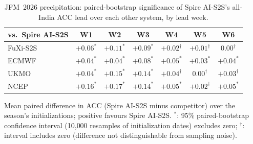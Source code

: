 \begin{table}[t]
  \centering
  \caption{JFM~2026 precipitation: paired-bootstrap significance of Spire AI-S2S's all-India ACC lead over each other system, by lead week.}
  \label{tab:jfm_sig_tp}
  \small
  \begin{tabular}{lcccccc}
    \toprule
    vs.\ Spire AI-S2S & W1 & W2 & W3 & W4 & W5 & W6 \\
    \midrule
    FuXi-S2S       & $+0.06^{*}$ & $+0.11^{*}$ & $+0.09^{*}$ & $+0.02^{\dagger}$ & $+0.01^{\dagger}$ & $0.00^{\dagger}$ \\
ECMWF          & $+0.04^{*}$ & $+0.04^{*}$ & $+0.08^{*}$ & $+0.05^{*}$ & $+0.03^{*}$ & $+0.04^{*}$ \\
UKMO           & $+0.04^{*}$ & $+0.15^{*}$ & $+0.14^{*}$ & $+0.04^{\dagger}$ & $0.00^{\dagger}$ & $+0.03^{\dagger}$ \\
NCEP           & $+0.16^{*}$ & $+0.17^{*}$ & $+0.14^{*}$ & $+0.05^{*}$ & $+0.02^{\dagger}$ & $+0.05^{*}$ \\
    \bottomrule
  \end{tabular}

  \vspace{2pt}
  \footnotesize\raggedright
  Mean paired difference in ACC (Spire AI-S2S minus competitor)
  over the season's initializations; positive favours
  Spire AI-S2S. $^{*}$: 95\% paired-bootstrap confidence
  interval (10{,}000 resamples of initialization dates) excludes zero;
  $^{\dagger}$: interval includes zero (difference not distinguishable
  from sampling noise).
\end{table}
